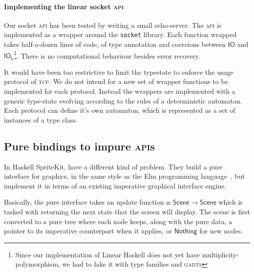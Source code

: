 \documentclass[acmsmall,screen]{acmart}\settopmatter{}
\newcommand{\Conid}[1]{\mathit{#1}}
\newcommand{\Varid}[1]{\mathit{#1}}
\def\resethooks{%
  \global\let\SaveRestoreHook\empty
  \global\let\ColumnHook\empty}
\let\hspre\empty
\let\hspost\empty
\renewcommand\Varid[1]{\mathord{\textsf{#1}}}
\renewcommand\Conid[1]{\mathord{\textsf{#1}}}
\newcommand{\varid}[1]{\ensuremath{\Varid{#1}}}
\newcommand\HaskeLL{Linear Haskell\xspace{}}
\begin{document}
\paragraph{Implementing the linear socket \textsc{api}}
%
Our socket \textsc{api} has been tested by writing a small
echo-server. The \textsc{api} is implemented as a wrapper around the
\texttt{socket} library. Each function wrapped takes half-a-dozen
lines of code, of type annotation and coercions between \ensuremath{\Conid{IO}} and
\ensuremath{\varid{IO}_{\varid{L}}}\footnote{Since our implementation of \HaskeLL{} does not yet
  have multiplicity-polymorphism, we had to fake it with type families
  and \textsc{gadts}}. There is no computational behaviour besides
error recovery.

It would have been too restrictive to limit the typestate to enforce
the usage protocol of \textsc{tcp}. We do not intend for a new set of
wrapper functions to be implemented for each protocol. Instead the
wrappers are implemented with a generic type-state evolving according
to the rules of a deterministic automaton. Each protocol can define
it's own automaton, which is represented as a set of instances of
a type class.

\subsection{Pure bindings to impure \textsc{api}s}
\label{sec:spritekit}

In Haskell SpriteKit, \citet{chakravarty_spritekit_2017} have a different kind
of problem. They build a pure interface for graphics, in the same style
as the Elm programming language~\cite{czaplicki_elm_2012}, but implement it in terms
of an existing imperative graphical interface engine.

Basically, the pure interface takes an update function \ensuremath{\Varid{u}\mathbin{:}\Conid{Scene}\to \Conid{Scene}} which is
tasked with returning the next state that the screen will display.
%
The scene is first converted to a
pure tree where each node keeps, along with the pure data, a pointer
to its imperative counterpart when it applies, or \ensuremath{\Conid{Nothing}} for new
nodes.
\resethooks
\end{document}
